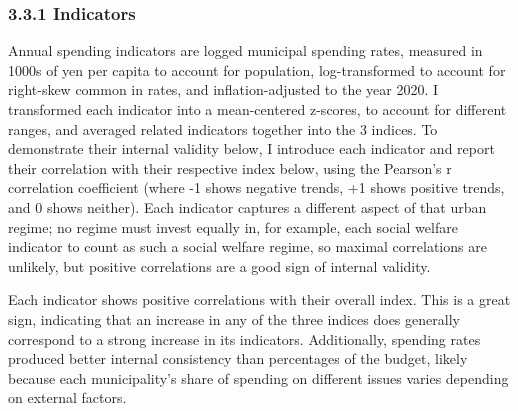 \documentclass[preprint, 3p,
authoryear]{elsarticle} %
\begin{document}
\hypertarget{indicators}{%
\subsubsection{3.3.1 Indicators}\label{indicators}}

Annual spending indicators are logged municipal spending rates, measured
in 1000s of yen per capita to account for population, log-transformed to
account for right-skew common in rates, and inflation-adjusted to the
year 2020. I transformed each indicator into a mean-centered z-scores,
to account for different ranges, and averaged related indicators
together into the 3 indices. To demonstrate their internal validity
below, I introduce each indicator and report their correlation with
their respective index below, using the Pearson's r correlation
coefficient (where -1 shows negative trends, +1 shows positive trends,
and 0 shows neither). Each indicator captures a different aspect of that
urban regime; no regime must invest equally in, for example, each social
welfare indicator to count as such a social welfare regime, so maximal
correlations are unlikely, but positive correlations are a good sign of
internal validity.

Each indicator shows positive correlations with their overall index.
This is a great sign, indicating that an increase in any of the three
indices does generally correspond to a strong increase in its
indicators. Additionally, spending rates produced better internal
consistency than percentages of the budget, likely because each
municipality's share of spending on different issues varies depending on
external factors.
\end{document}
